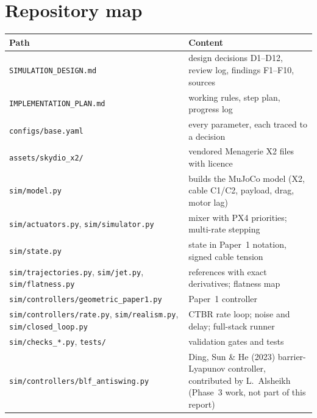 \documentclass[11pt,a4paper]{article}
\newcommand{\code}[1]{\texttt{\small #1}}
\begin{document}
\section{Repository map}
\begin{table}[H]
\centering\small
\begin{tabularx}{\textwidth}{@{}l X@{}}
\toprule
Path & Content \\
\midrule
\code{SIMULATION\_DESIGN.md} & design decisions D1--D12, review log, findings F1--F10, sources \\
\code{IMPLEMENTATION\_PLAN.md} & working rules, step plan, progress log \\
\code{configs/base.yaml} & every parameter, each traced to a decision \\
\code{assets/skydio\_x2/} & vendored Menagerie X2 files with licence \\
\code{sim/model.py} & builds the MuJoCo model (X2, cable C1/C2, payload, drag, motor lag) \\
\code{sim/actuators.py}, \code{sim/simulator.py} & mixer with PX4 priorities; multi-rate stepping \\
\code{sim/state.py} & state in Paper~1 notation, signed cable tension \\
\code{sim/trajectories.py}, \code{sim/jet.py}, \code{sim/flatness.py} & references with exact derivatives; flatness map \\
\code{sim/controllers/geometric\_paper1.py} & Paper~1 controller \\
\code{sim/controllers/rate.py}, \code{sim/realism.py}, \code{sim/closed\_loop.py} & CTBR rate loop; noise and delay; full-stack runner \\
\code{sim/checks\_*.py}, \code{tests/} & validation gates and tests \\
\code{sim/controllers/blf\_antiswing.py} & Ding, Sun \& He (2023) barrier-Lyapunov controller, contributed by L.~Alsheikh (Phase~3 work, not part of this report) \\
\bottomrule
\end{tabularx}
\end{table}
\end{document}
